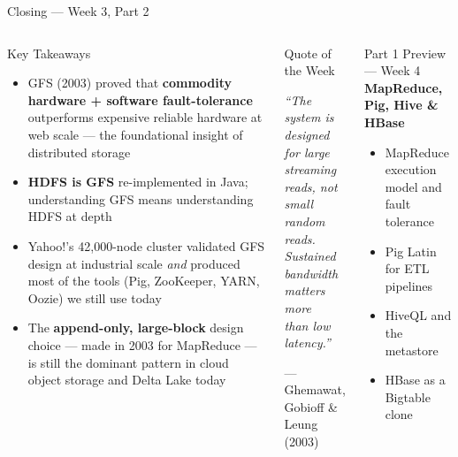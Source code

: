 \documentclass[aspectratio=169,10pt]{beamer}
\begin{document}
\begin{frame}{Closing — Week 3, Part 2}
  \begin{columns}[T]
      \begin{block}{Key Takeaways}
        \begin{itemize}
          \item GFS (2003) proved that \textbf{commodity hardware + software
                fault-tolerance} outperforms expensive reliable hardware
                at web scale — the foundational insight of distributed storage
          \item \textbf{HDFS is GFS} re-implemented in Java;
                understanding GFS means understanding HDFS at depth
          \item Yahoo!'s 42{,}000-node cluster validated GFS design
                at industrial scale \emph{and} produced most of the
                tools (Pig, ZooKeeper, YARN, Oozie) we still use today
          \item The \textbf{append-only, large-block} design choice —
                made in 2003 for MapReduce — is still the dominant
                pattern in cloud object storage and Delta Lake today
        \end{itemize}
      \end{block}

      \begin{alertblock}{Quote of the Week}
        \begin{center}
        \large\itshape
        ``The system is designed for large\\
        streaming reads, not small random reads.\\
        Sustained bandwidth matters more\\
        than low latency.''
        \end{center}
        \begin{flushright}
        \small --- Ghemawat, Gobioff \& Leung (2003)
        \end{flushright}
      \end{alertblock}
      \vspace{6pt}
      \begin{exampleblock}{Part 1 Preview — Week 4}
        \textbf{MapReduce, Pig, Hive \& HBase}\\[3pt]
        \begin{itemize}\setlength\itemsep{1pt}
          \item MapReduce execution model and fault tolerance
          \item Pig Latin for ETL pipelines
          \item HiveQL and the metastore
          \item HBase as a Bigtable clone
        \end{itemize}
      \end{exampleblock}
  \end{columns}
\end{frame}

\end{document}
